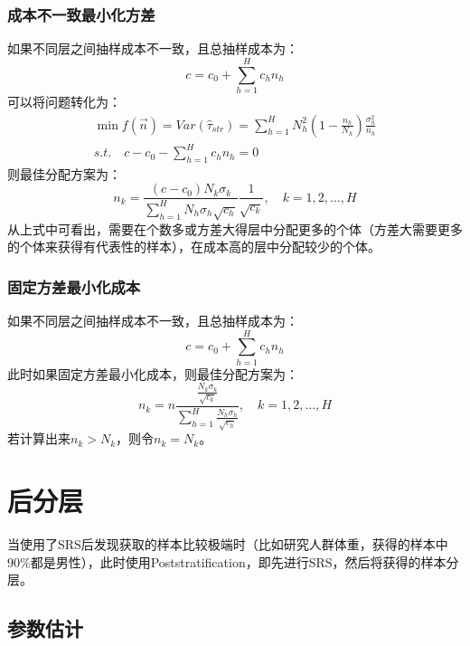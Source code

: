 \subsubsection{成本不一致最小化方差}
如果不同层之间抽样成本不一致，且总抽样成本为：
\begin{equation*}
	c=c_0+\sum_{h=1}^Hc_hn_h
\end{equation*}
可以将问题转化为：
\begin{gather*}
	\min f(\overrightarrow{n})=Var(\hat{\tau}_{str})=\sum_{h=1}^HN_h^2\left(1-\frac{n_h}{N_h}\right)\frac{\sigma_h^2}{n_h} \\
	s.t.\quad c-c_0-\sum_{h=1}^Hc_hn_h=0
\end{gather*}
则最佳分配方案为：
\begin{equation*}
	n_k=\frac{(c-c_0)N_k\sigma_k}{\sum\limits_{h=1}^HN_h\sigma_h\sqrt{c_h}}\frac{1}{\sqrt{c_k}},\quad k=1,2,\dots,H
\end{equation*}
从上式中可看出，需要在个数多或方差大得层中分配更多的个体（方差大需要更多的个体来获得有代表性的样本），在成本高的层中分配较少的个体。
\subsubsection{固定方差最小化成本}
如果不同层之间抽样成本不一致，且总抽样成本为：
\begin{equation*}
	c=c_0+\sum_{h=1}^Hc_hn_h
\end{equation*}
此时如果固定方差最小化成本，则最佳分配方案为：
\begin{equation*}
	n_k=n\frac{\frac{N_k\sigma_k}{\sqrt{c_k}}}{\sum\limits_{h=1}^H\frac{N_h\sigma_h}{\sqrt{c_h}}},\quad k=1,2,\dots,H
\end{equation*}
若计算出来$n_k>N_k$，则令$n_k=N_k$。


\section{后分层}
当使用了SRS后发现获取的样本比较极端时（比如研究人群体重，获得的样本中$90\%$都是男性），此时使用\gls{Poststratification}，即先进行SRS，然后将获得的样本分层。

\subsection{参数估计}

